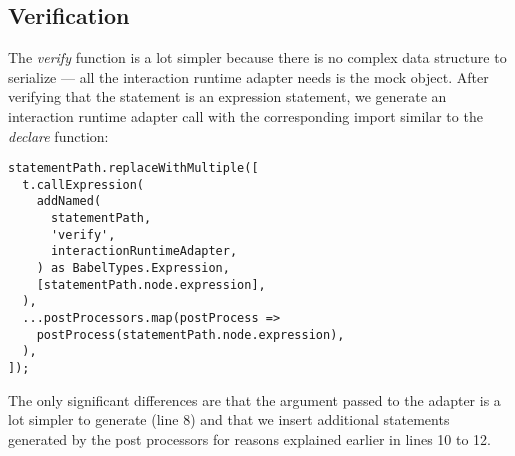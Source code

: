 \subsection{Verification}
The \textit{verify} function is a lot simpler because there is no
complex data structure to serialize ---
all the interaction runtime adapter needs is the mock object.
After verifying that the statement is an expression statement,
we generate an interaction runtime adapter call
with the corresponding import
similar to the \textit{declare} function:
\begin{verbatim}
statementPath.replaceWithMultiple([
  t.callExpression(
    addNamed(
      statementPath,
      'verify',
      interactionRuntimeAdapter,
    ) as BabelTypes.Expression,
    [statementPath.node.expression],
  ),
  ...postProcessors.map(postProcess =>
    postProcess(statementPath.node.expression),
  ),
]);
\end{verbatim}
The only significant differences are
that the argument passed to the adapter
is a lot simpler to generate (line 8) and
that we insert additional statements
generated by the post processors
for reasons explained earlier
in lines 10 to 12.
